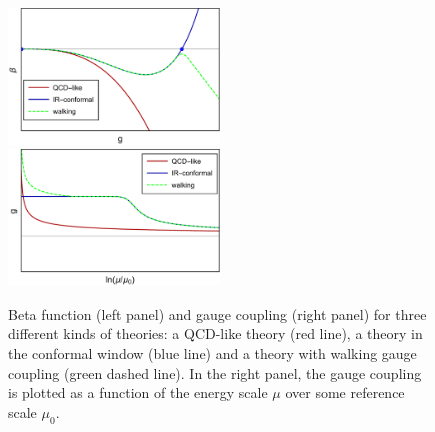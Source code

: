 \begin{figure}[b!]
\includegraphics[width=0.5\textwidth]{pics/beta_walking}~~~
\includegraphics[width=0.5\textwidth]{pics/g_walking}
\caption{Beta function (left panel) and gauge coupling (right panel) for three different kinds of theories: a QCD-like theory (red line), a theory in the conformal window (blue line) and a theory with walking gauge coupling (green dashed line). In the right panel, the gauge coupling is plotted as a function of the energy scale $\mu$ over some reference scale $\mu_0$.} 
\label{walking}
\end{figure}


